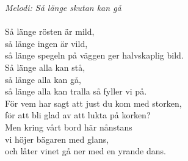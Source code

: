 {\footnotesize\textit{Melodi: Så länge skutan kan gå}}\\
\\
Så länge rösten är mild,\\
så länge ingen är vild,\\
så länge spegeln på väggen ger halvskaplig bild.\\
Så länge alla kan stå,\\
så länge alla kan gå,\\
så länge alla kan tralla så fyller vi på.\\
För vem har sagt att just du kom med storken,\\
för att bli glad av att lukta på korken?\\
Men kring vårt bord här nånstans\\
vi höjer bägaren med glans,\\
och låter vinet gå ner med en yrande dans.
